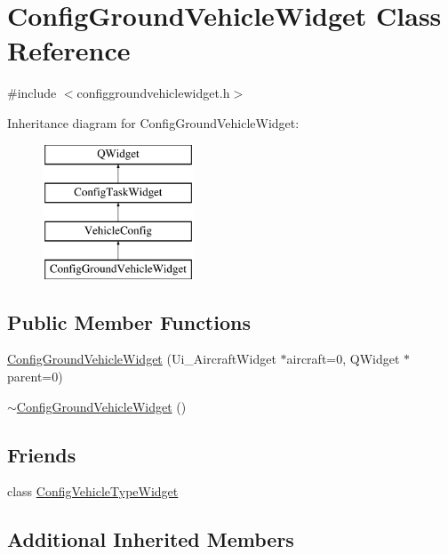 \hypertarget{class_config_ground_vehicle_widget}{\section{Config\-Ground\-Vehicle\-Widget Class Reference}
\label{class_config_ground_vehicle_widget}
}


{\ttfamily \#include $<$configgroundvehiclewidget.\-h$>$}

Inheritance diagram for Config\-Ground\-Vehicle\-Widget\-:\begin{figure}[H]
\begin{center}
\leavevmode
\includegraphics[height=4.000000cm]{class_config_ground_vehicle_widget}
\end{center}
\end{figure}
\subsection*{Public Member Functions}
\begin{DoxyCompactItemize}
\item 
\hyperlink{group___config_plugin_ga7d15969655ebd8ccde81977fd63cc516}{Config\-Ground\-Vehicle\-Widget} (Ui\-\_\-\-Aircraft\-Widget $\ast$aircraft=0, Q\-Widget $\ast$parent=0)
\item 
\hyperlink{group___config_plugin_ga9104e5fbab423b4e0f0b1f7bc92b4a87}{$\sim$\-Config\-Ground\-Vehicle\-Widget} ()
\end{DoxyCompactItemize}
\subsection*{Friends}
\begin{DoxyCompactItemize}
\item 
class \hyperlink{group___config_plugin_gaf1f904d5df6619518f3228b2d5d238d0}{Config\-Vehicle\-Type\-Widget}
\end{DoxyCompactItemize}
\subsection*{Additional Inherited Members}


